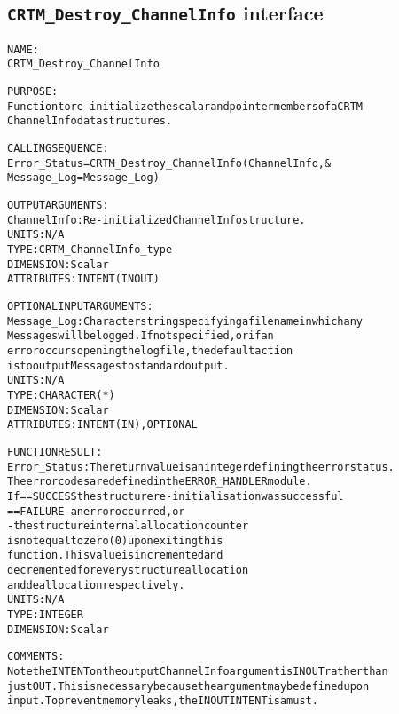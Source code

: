 \subsection{\texttt{CRTM\_Destroy\_ChannelInfo} interface}
  \label{sec:CRTM_Destroy_ChannelInfo_interface}
  \begin{alltt}
 
  NAME:
        CRTM_Destroy_ChannelInfo
  
  PURPOSE:
        Function to re-initialize the scalar and pointer members of a CRTM
        ChannelInfo data structures.
 
  CALLING SEQUENCE:
        Error_Status = CRTM_Destroy_ChannelInfo( ChannelInfo            , &
                                                 Message_Log=Message_Log  )
  
  OUTPUT ARGUMENTS:
        ChannelInfo:  Re-initialized ChannelInfo structure.
                      UNITS:      N/A
                      TYPE:       CRTM_ChannelInfo_type
                      DIMENSION:  Scalar
                      ATTRIBUTES: INTENT(IN OUT)
 
  OPTIONAL INPUT ARGUMENTS:
        Message_Log:  Character string specifying a filename in which any
                      Messages will be logged. If not specified, or if an
                      error occurs opening the log file, the default action
                      is to output Messages to standard output.
                      UNITS:      N/A
                      TYPE:       CHARACTER(*)
                      DIMENSION:  Scalar
                      ATTRIBUTES: INTENT(IN), OPTIONAL
 
  FUNCTION RESULT:
        Error_Status: The return value is an integer defining the error status.
                      The error codes are defined in the ERROR_HANDLER module.
                      If == SUCCESS the structure re-initialisation was successful
                         == FAILURE - an error occurred, or
                                    - the structure internal allocation counter
                                      is not equal to zero (0) upon exiting this
                                      function. This value is incremented and
                                      decremented for every structure allocation
                                      and deallocation respectively.
                      UNITS:      N/A
                      TYPE:       INTEGER
                      DIMENSION:  Scalar
 
  COMMENTS:
        Note the INTENT on the output ChannelInfo argument is IN OUT rather than
        just OUT. This is necessary because the argument may be defined upon
        input. To prevent memory leaks, the IN OUT INTENT is a must.
 
  \end{alltt}
